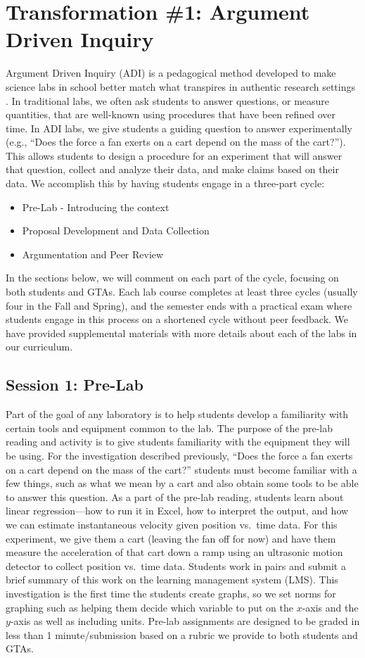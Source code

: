 \documentclass[aip, numerical, preprint]{revtex4-2}
\begin{document}
\section{Transformation \#1: Argument Driven Inquiry}
Argument Driven Inquiry (ADI) is a pedagogical method developed to make science labs in school
better match what transpires in authentic research settings
\citep{Walker2011,Sampson2011,Walker2016}.  In traditional labs, we often ask students to
answer questions, or measure quantities, that are well-known using procedures that have been
refined over time.  In ADI labs, we give students a guiding question to answer experimentally
(e.g., ``Does the force a fan exerts on a cart depend on the mass of the cart?''). This allows
students to design a procedure for an experiment that will answer that question, collect and
analyze their data, and make claims based on their data.  We accomplish this by having students
engage in a three-part cycle:
\begin{itemize}
  \item Pre-Lab - Introducing the context
  \item Proposal Development and Data Collection
  \item Argumentation and Peer Review
\end{itemize}
In the sections below, we will comment on each part of the cycle, focusing on both students and
GTAs. Each lab course completes at least three cycles (usually four in the Fall and Spring),
and the semester ends with a practical exam where students engage in this process on a
shortened cycle without peer feedback.\cite{Wolf2019mask} We have provided supplemental
materials with more details about each of the labs in our curriculum.

\subsection{Session 1: Pre-Lab}
Part of the goal of any laboratory is to help students develop a familiarity with certain tools
and equipment common to the lab.  The purpose of the pre-lab reading and activity is to give
students familiarity with the equipment they will be using.  For the investigation described
previously, ``Does the force a fan exerts on a cart depend on the mass of the cart?''  students
must become familiar with a few things, such as what we mean by a cart and also obtain some
tools to be able to answer this question.  As a part of the pre-lab reading, students learn
about linear regression---how to run it in Excel, how to interpret the output, and how we can
estimate instantaneous velocity given position vs.\ time data. For this experiment, we give
them a cart (leaving the fan off for now) and have them measure the acceleration of that cart
down a ramp using an ultrasonic motion detector to collect position vs.\ time data.  Students
work in pairs and submit a brief summary of this work on the learning management system
(LMS). This investigation is the first time the students create graphs, so we set norms for
graphing such as helping them decide which variable to put on the $x$-axis and the $y$-axis as
well as including units.  Pre-lab assignments are designed to be graded in less than 1
minute/submission based on a rubric we provide to both students and GTAs.
\end{document}
